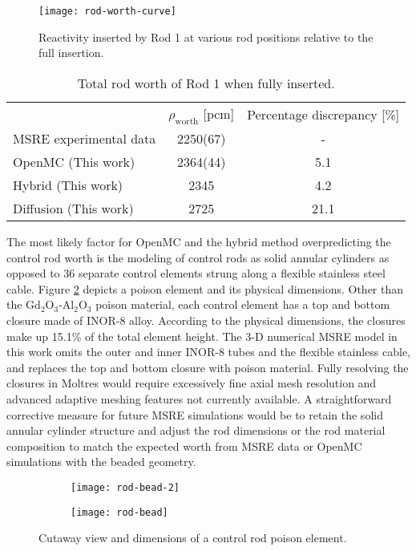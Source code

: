 \begin{figure}[t]
  \centering
  \texttt{[image: rod-worth-curve]}
  \caption{Reactivity inserted by Rod 1 at various rod positions relative to the full insertion.}
  \label{fig:rod-worth}
\end{figure}

\begin{table}[t]
  \centering
  \caption{Total rod worth of Rod 1 when fully inserted.}
  \begin{tabular}{l S[table-format=4(2)] S}
    \toprule
     & {$\rho_\text{worth}$ [pcm]} & {Percentage discrepancy [\%]}\\
     \cmidrule(rl){2-2} \cmidrule(l){3-3}
    \gls{MSRE} experimental data & 2250(67) & {-}\\
    OpenMC (This work) & 2364(44) & 5.1 \\
    Hybrid (This work) & 2345 & 4.2 \\
    Diffusion (This work) & 2725 & 21.1 \\
    \bottomrule
  \end{tabular}
  \label{table:rod-worth}
\end{table}

The most likely factor for OpenMC and the hybrid method overpredicting the control rod worth is the
modeling of control rods as solid annular cylinders as opposed to 36 separate control elements
strung along a flexible stainless steel cable. Figure \ref{fig:rod-bead} depicts a poison element
and its physical dimensions. Other than the Gd$_2$O$_3$-Al$_2$O$_3$ poison material, each control
element has a top and bottom closure made of INOR-8 alloy. According to the physical dimensions,
the closures make up 15.1\% of the total element height. The 3-D numerical \gls{MSRE} model in this
work omits the outer and inner INOR-8 tubes and the flexible stainless cable, and replaces the top
and bottom closure with poison material. Fully resolving the closures in Moltres would require
excessively fine axial mesh resolution and advanced adaptive meshing features not currently
available. A straightforward corrective measure for future \gls{MSRE} simulations would be to
retain the solid annular cylinder structure and adjust the rod dimensions or the rod material
composition to match the expected worth from \gls{MSRE} data or OpenMC simulations with the beaded
geometry.

\begin{figure}[t]
  \begin{subfigure}[b]{0.33\columnwidth}
    \centering
    \texttt{[image: rod-bead-2]}
  \end{subfigure}
  \begin{subfigure}[b]{0.65\columnwidth}
    \centering
    \texttt{[image: rod-bead]}
  \end{subfigure}
  \caption{Cutaway view and dimensions of a control rod poison element.}
  \label{fig:rod-bead}
\end{figure}

